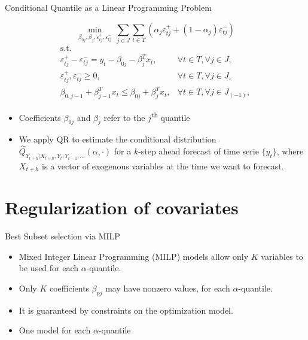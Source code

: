 \documentclass[11pt]{beamer}
\begin{document}
\begin{frame}{Conditional Quantile as a Linear Programming Problem}

\[
\min_{\beta_{0j},\beta_j,\varepsilon_{tj}^{+}, \varepsilon_{tj}^{-}} \, \sum_{j \in J} \sum_{t \in T}\left(\alpha_j \varepsilon_{t j}^{+}+(1-\alpha_j)\varepsilon_{t j}^{-}\right)
\] \[
\begin{array}{lr}
\text{s.t.} &\\
\varepsilon_{t j}^{+}-\varepsilon_{t j}^{-}=y_{t} - \beta_{0j} - \beta_{j}^T x_{t}, & \forall t \in T, \forall j \in J, \\
\varepsilon_{tj}^+,\varepsilon_{tj}^- \geq 0, & \forall t \in T,\forall j \in J,\\
\beta_{0,j-1} + \beta_{j-1}^T x_{t} \leq \beta_{0j} + \beta_{j}^T x_{t},
& \forall t \in T, \forall j \in J_{(-1)},
\end{array}
\]

\begin{itemize}
\item
Coefficients \(\beta_{0j}\) and \(\beta_j\) refer to the
\(j\)\textsuperscript{th} quantile
\item
We apply QR to estimate the conditional distribution
\(\hat{Q}_{Y_{t+h}|X_{t+h},Y_t, Y_{t-1}, \dots} (\alpha,\cdot)\) for a
\(k\)-step ahead forecast of time serie \(\{y_t\}\), where \(X_{t+h}\)
is a vector of exogenous variables at the time we want to forecast.
\end{itemize}

\end{frame}

\section{Regularization of
covariates}\label{regularization-of-covariates}

\begin{frame}{Best Subset selection via MILP}

\begin{itemize}

\item
Mixed Integer Linear Programming (MILP) models allow only \(K\)
variables to be used for each \(\alpha\)-quantile.
\item
Only \(K\) coefficients \(\beta_{pj}\) may have nonzero values, for
each \(\alpha\)-quantile.
\item
It is guaranteed by constraints on the optimization model.
\item
One model for each \(\alpha\)-quantile
\end{itemize}

\end{frame}
\end{document}

